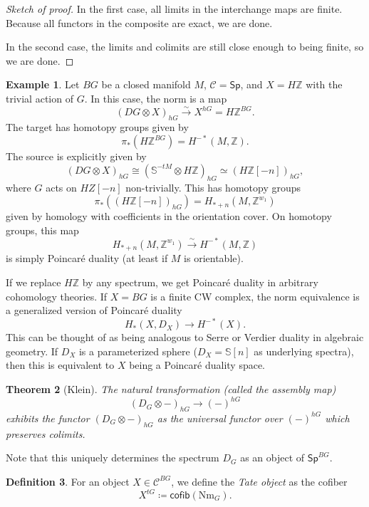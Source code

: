 \documentclass[10pt]{amsart}
\newtheorem{thm}{Theorem}[subsection]
\theoremstyle{definition}
\newtheorem{defn}[thm]{Definition}
\newtheorem{exm}[thm]{Example}
\theoremstyle{remark}
\theoremstyle{plain}
\theoremstyle{definition}
\theoremstyle{remark}
\newcommand{\Z}{\mathbb{Z}}
\newcommand{\bS}{\mathbb{S}}
\newcommand{\mc}[1]{\mathcal{#1}}
\newcommand{\mr}[1]{\mathrm{#1}}
\newcommand{\ms}[1]{\mathsf{#1}}
\newcommand{\1}{\mathbf{1}}
\newcommand{\2}{\mathbf{2}}
\newcommand{\3}{\mathbf{3}}
\begin{document}
\begin{proof}[Sketch of proof]
    In the first case, all limits in the interchange maps are finite. Because all functors in the composite are exact, we are done.

    In the second case, the limits and colimits are still close enough to being finite, so we are done.
\end{proof}

\begin{exm}
    Let $BG$ be a closed manifold $M$, $\mc{C} = \ms{Sp}$, and $X = H\Z$ with the trivial action of $G$. In this case, the norm is a map
    \[ (DG \otimes X)_{hG} \xrightarrow{\sim} X^{hG} = H\Z^{BG}. \]
    The target has homotopy groups given by
    \[ \pi_* (H\Z^{BG}) = H^{-*}(M, \Z). \]
    The source is explicitly given by
    \[ (DG \otimes X)_{hG} \cong (\bS^{-tM} \otimes H\Z)_{hG} \simeq (H\Z[-n])_{hG}, \]
    where $G$ acts on $HZ[-n]$ non-trivially. This has homotopy groups
    \[ \pi_*((H\Z[-n])_{hG}) = H_{*+n}(M, \Z^{w_1}) \]
    given by homology with coefficients in the orientation cover. On homotopy groups, this map
    \[ H_{*+n}(M, \Z^{w_1}) \xrightarrow{\sim} H^{-*}(M, \Z) \]
    is simply Poincar\'e duality (at least if $M$ is orientable).
\end{exm}

If we replace $H\Z$ by any spectrum, we get Poincar\'e duality in arbitrary cohomology theories. If $X = BG$ is a finite CW complex, the norm equivalence is a generalized version of Poincar\'e duality
\[ H_*(X, D_X) \to H^{-*}(X). \]
This can be thought of as being analogous to Serre or Verdier duality in algebraic geometry. If $D_X$ is a parameterized sphere ($D_X = \bS[n]$ as underlying spectra), then this is equivalent to $X$ being a Poincar\'e duality space.

\begin{thm}[Klein]
    The natural transformation (called the \textit{assembly map})
    \[ (D_G \otimes -)_{hG} \to (-)^{hG} \]
    exhibits the functor $(D_G \otimes -)_{hG}$ as the universal functor over $(-)^{hG}$ which preserves colimits.
\end{thm}

Note that this uniquely determines the spectrum $D_G$ as an object of $\ms{Sp}^{BG}$.

\begin{defn}
    For an object $X \in \mc{C}^{BG}$, we define the \textit{Tate object} as the cofiber
    \[ X^{tG} \coloneqq \ms{cofib}(\mr{Nm}_G). \]
\end{defn}
\end{document}
